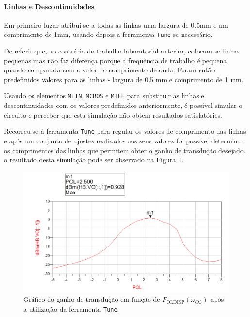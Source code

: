 \documentclass[11pt]{article}
\numberwithin{equation}{section}
\begin{document}
\pagebreak

\paragraph{Linhas e Descontinuidades} \hspace{0pt} 

Em primeiro lugar atribui-se a todas as linhas uma largura de 0.5mm e um comprimento de 1mm, usando depois a ferramenta \texttt{Tune} se necessário.

De referir que, ao contrário do trabalho laboratorial anterior, colocam-se linhas pequenas mas não faz diferença porque a frequência de trabalho é pequena quando comparada com o valor do comprimento de onda. Foram então predefinidos valores para as linhas - largura de 0.5 mm e comprimento de 1 mm.

Usando os elementos \texttt{MLIN}, \texttt{MCROS} e \texttt{MTEE} para substituir as linhas e descontinuidades com os valores predefinidos anteriormente, é possível simular o circuito e perceber que esta simulação não obtem resultados satisfatórios.

Recorreu-se à ferramenta \texttt{Tune} para regular os valores de comprimento das linhas e após um conjunto de ajustes realizados aos seus valores foi possível determinar os comprimentos das linhas que permitem obter o ganho de transdução desejado. o resultado desta simulação pode ser observado na Figura \ref{fig:GT_tune}.

\begin{figure}[h]
\centering
\includegraphics[keepaspectratio=true, scale=0.60]{exps/GT_tune}
\vspace{-0.5em}
\caption{Gráfico do ganho de transdução em função de $ P_{\text{OLDISP}}\left(\omega_{OL}\right) $ após a utilização da ferramenta \texttt{Tune}.}
\vspace{-0.8em}
\label{fig:GT_tune}
\end{figure}
\end{document}
